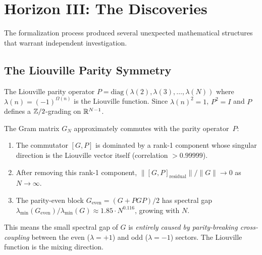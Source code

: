 \documentclass[11pt,a4paper]{article}
\begin{document}
\section{Horizon III: The Discoveries}
\label{sec:discoveries}

The formalization process produced several unexpected mathematical
structures that warrant independent investigation.

\subsection{The Liouville Parity Symmetry}

\begin{definition}
The Liouville parity operator $P = \mathrm{diag}(\lambda(2), \lambda(3),
\ldots, \lambda(N))$ where $\lambda(n) = (-1)^{\Omega(n)}$ is the
Liouville function. Since $\lambda(n)^2 = 1$, $P^2 = I$ and $P$
defines a $\mathbb{Z}/2$-grading on $\mathbb{R}^{N-1}$.
\end{definition}

\begin{theorem}
The Gram matrix $G_N$ approximately commutes with the parity operator~$P$:
\begin{enumerate}
  \item The commutator $[G, P]$ is dominated by a rank-1 component whose
    singular direction is the Liouville vector itself (correlation $> 0.99999$).
  \item After removing this rank-1 component,
    $\|[G,P]_{\mathrm{residual}}\|/\|G\| \to 0$ as $N \to \infty$.
  \item The parity-even block $G_{\mathrm{even}} = (G + PGP)/2$ has
    spectral gap $\lambda_{\min}(G_{\mathrm{even}})/\lambda_{\min}(G)
    \approx 1.85 \cdot N^{0.116}$, growing with $N$.
\end{enumerate}
\end{theorem}

This means the small spectral gap of $G$ is \emph{entirely caused by
parity-breaking cross-coupling} between the even ($\lambda = +1$) and
odd ($\lambda = -1$) sectors. The Liouville function is the mixing
direction.
\end{document}
